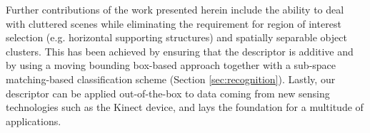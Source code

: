 \documentclass[a4paper, 10 pt, conference]{sty/ieeeconf}
\begin{document}
Further contributions of the work presented herein include the ability to deal with
cluttered scenes while eliminating the requirement for region of interest
selection (e.g. horizontal supporting structures) and spatially separable object
clusters. This has been achieved by ensuring that the descriptor is additive and by using a
moving bounding box-based approach together with a sub-space matching-based classification scheme (Section
\ref{sec:recognition}). 
Lastly, our descriptor can be applied out-of-the-box to data coming from 
new sensing technologies such as the Kinect device, and lays the foundation for a
multitude of applications.



\end{document}
